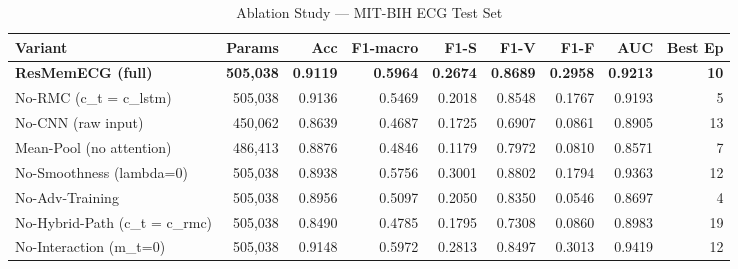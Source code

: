 \begin{table}[h]
\centering
\caption{Ablation Study --- MIT-BIH ECG Test Set}
\label{tab:ablation}
\begin{tabular}{lrrrrrrrr}
\toprule
Variant & Params & Acc & F1-macro & F1-S & F1-V & F1-F & AUC & Best Ep \\
\midrule
\textbf{ResMemECG (full)} & \textbf{505,038} & \textbf{0.9119} & \textbf{0.5964} & \textbf{0.2674} & \textbf{0.8689} & \textbf{0.2958} & \textbf{0.9213} & \textbf{10} \\
No-RMC (c_t = c_lstm) & 505,038 & 0.9136 & 0.5469 & 0.2018 & 0.8548 & 0.1767 & 0.9193 & 5 \\
No-CNN (raw input) & 450,062 & 0.8639 & 0.4687 & 0.1725 & 0.6907 & 0.0861 & 0.8905 & 13 \\
Mean-Pool (no attention) & 486,413 & 0.8876 & 0.4846 & 0.1179 & 0.7972 & 0.0810 & 0.8571 & 7 \\
No-Smoothness (lambda=0) & 505,038 & 0.8938 & 0.5756 & 0.3001 & 0.8802 & 0.1794 & 0.9363 & 12 \\
No-Adv-Training & 505,038 & 0.8956 & 0.5097 & 0.2050 & 0.8350 & 0.0546 & 0.8697 & 4 \\
No-Hybrid-Path (c_t = c_rmc) & 505,038 & 0.8490 & 0.4785 & 0.1795 & 0.7308 & 0.0860 & 0.8983 & 19 \\
No-Interaction (m_t=0) & 505,038 & 0.9148 & 0.5972 & 0.2813 & 0.8497 & 0.3013 & 0.9419 & 12 \\
\bottomrule
\end{tabular}
\end{table}
